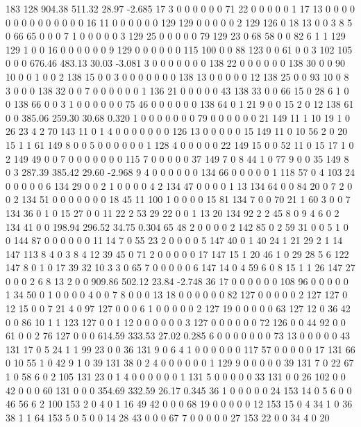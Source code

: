 183 128
904.38 511.32 28.97 -2.685
 17 3 0 0 0 0 0 0 71 22 0 0 0 0 0 1 17 13 0 0
 0 0 0 0 0 0 0 0 0 0 0 0 16 11 0 0 0 0 0 0
 129 129 0 0 0 0 0 2 129 126 0 18 13 0 0 3 8 5 0 66
 65 0 0 0 7 1 0 0 0 0 0 3 129 25 0 0 0 0 0 79
 129 23 0 68 58 0 0 82 6 1 1 129 129 1 0 0 16 0 0 0
 0 0 0 9 129 0 0 0 0 0 0 115 100 0 0 88 123 0 0 61
 0 0 3 102 105 0 0 0
676.46 483.13 30.03 -3.081
 3 0 0 0 0 0 0 0 138 22 0 0 0 0 0 0 138 30 0 0
 90 10 0 0 1 0 0 2 138 15 0 0 3 0 0 0 0 0 0 0
 138 13 0 0 0 0 0 12 138 25 0 0 93 10 0 8 3 0 0 0
 138 32 0 0 7 0 0 0 0 0 0 1 136 21 0 0 0 0 0 43
 138 33 0 0 66 15 0 28 6 1 0 0 138 66 0 0 3 1 0 0
 0 0 0 0 75 46 0 0 0 0 0 0 138 64 0 1 21 9 0 0
 15 2 0 12 138 61 0 0
385.06 259.30 30.68 0.320
 1 0 0 0 0 0 0 0 79 0 0 0 0 0 0 21 149 11 1 10
 19 1 0 26 23 4 2 70 143 11 0 1 4 0 0 0 0 0 0 0
 126 13 0 0 0 0 0 15 149 11 0 10 56 2 0 20 15 1 1 61
 149 8 0 0 5 0 0 0 0 0 0 1 128 4 0 0 0 0 0 22
 149 15 0 0 52 11 0 15 17 1 0 2 149 49 0 0 7 0 0 0
 0 0 0 0 115 7 0 0 0 0 0 37 149 7 0 8 44 1 0 77
 9 0 0 35 149 8 0 3
287.39 385.42 29.60 -2.968
 9 4 0 0 0 0 0 0 134 66 0 0 0 0 0 1 118 57 0 4
 103 24 0 0 0 0 0 6 134 29 0 0 2 1 0 0 0 0 4 2
 134 47 0 0 0 0 1 13 134 64 0 0 84 20 0 7 2 0 0 2
 134 51 0 0 0 0 0 0 0 18 45 11 100 1 0 0 0 0 15 81
 134 7 0 0 70 21 1 60 3 0 0 7 134 36 0 1 0 15 27 0
 0 11 22 2 53 29 22 0 0 1 13 20 134 92 2 2 45 8 0 9
 4 6 0 2 134 41 0 0
198.94 296.52 34.75 0.304
 65 48 2 0 0 0 0 2 142 85 0 2 59 31 0 0 5 1 0 0
 144 87 0 0 0 0 0 0 11 14 7 0 55 23 2 0 0 0 0 5
 147 40 0 1 40 24 1 21 29 2 1 14 147 113 8 4 0 3 8 4
 12 39 45 0 71 2 0 0 0 0 0 17 147 15 1 20 46 1 0 29
 28 5 6 122 147 8 0 1 0 17 39 32 10 3 3 0 65 7 0 0
 0 0 0 6 147 14 0 4 59 6 0 8 15 1 1 26 147 27 0 0
 0 2 6 8 13 2 0 0
909.86 502.12 23.84 -2.748
 36 17 0 0 0 0 0 0 108 96 0 0 0 0 0 1 34 50 0 1
 0 0 0 0 4 0 0 7 8 0 0 0 13 18 0 0 0 0 0 0
 82 127 0 0 0 0 0 2 127 127 0 12 15 0 0 7 21 4 0 97
 127 0 0 0 6 1 0 0 0 0 0 2 127 19 0 0 0 0 0 63
 127 12 0 36 42 0 0 86 10 1 1 123 127 0 0 1 12 0 0 0
 0 0 0 3 127 0 0 0 0 0 0 72 126 0 0 44 92 0 0 61
 0 0 2 76 127 0 0 0
614.59 333.53 27.02 0.285
 6 0 0 0 0 0 0 0 73 13 0 0 0 0 0 43 131 17 0 5
 24 1 1 99 23 0 0 36 131 9 0 6 4 1 0 0 0 0 0 0
 117 57 0 0 0 0 0 17 131 66 0 10 55 1 0 42 9 1 0 39
 131 38 0 2 4 0 0 0 0 0 0 1 129 9 0 0 0 0 0 39
 131 7 0 22 67 1 0 58 6 0 2 105 131 23 0 1 4 0 0 0
 0 0 0 1 131 5 0 0 0 0 0 33 131 0 0 26 102 0 0 42
 0 0 0 60 131 0 0 0
354.69 332.59 26.17 0.345
 36 1 0 0 0 0 0 24 153 14 0 5 6 0 0 46 56 6 2 100
 153 2 0 4 0 1 16 49 42 0 0 0 68 19 0 0 0 0 0 12
 153 15 0 4 34 1 0 36 38 1 1 64 153 5 0 5 0 0 14 28
 43 0 0 0 67 7 0 0 0 0 0 27 153 22 0 0 34 4 0 20
